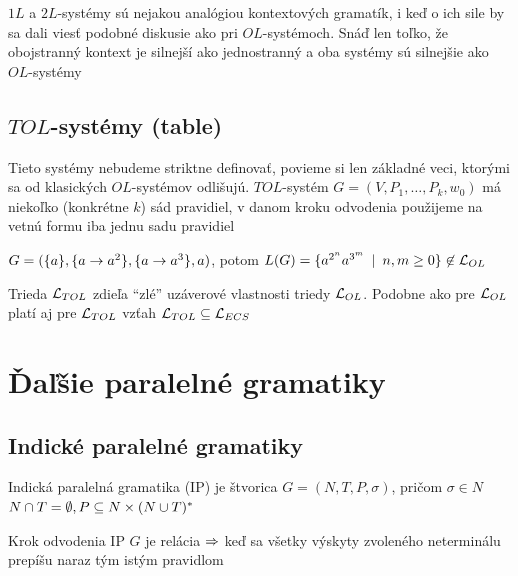 \begin{poznamka}
  $1L$ a $2L$-systémy sú nejakou analógiou kontextových gramatík, i
  keď o ich sile by sa dali viesť podobné diskusie ako pri
  $OL$-systémoch. Snáď len toľko, že obojstranný kontext je silnejší
  ako jednostranný a oba systémy sú silnejšie ako $OL$-systémy
\end{poznamka}

\subsection{$TOL$-systémy (table)}

Tieto systémy nebudeme striktne definovať, povieme si len základné
veci, ktorými sa od kla\-sic\-kých $OL$-systémov odlišujú.
$TOL$-systém $G=(V,P_{1},\dots,P_{k},w_{0})$ má niekoľko
(konkrétne $k$) sád pravidiel, v danom kroku odvodenia použijeme
na vetnú formu iba jednu sadu pravidiel

\begin{priklad}
  $G=(\{a\},\{a\rightarrow a^{2}\},\{a\rightarrow a^{3}\},a)$, potom
  $L(G)=\{a^{2^{n}}a^{3^{m}}\enspace |\enspace n,m\geq0\}\not\in \mathcal{L}_{OL}$
\end{priklad}

\begin{poznamka}
  Trieda $\mathcal{L}_{TOL}$ zdieľa ``zlé'' uzáverové vlastnosti
  triedy $\mathcal{L}_{OL}$. Podobne ako pre $\mathcal{L}_{OL}$
  platí aj pre $\mathcal{L}_{TOL}$ vzťah
  $\mathcal{L}_{TOL} \subseteq \mathcal{L}_{ECS}$
\end{poznamka}

\section{Ďaľšie paralelné gramatiky}

\subsection{Indické paralelné gramatiky}

\begin{definicia}
  Indická paralelná gramatika (IP) je štvorica $G=(N,T,P,\sigma)$,
  pričom \mbox{$\sigma\in N$} $N\cap T=\emptyset, P\subseteq
  N\times(N\cup T)^{*}$
\end{definicia}

\begin{definicia}
  Krok odvodenia IP $G$ je relácia $\Rightarrow$ keď sa všetky výskyty
  zvoleného neterminálu prepíšu naraz tým istým pravidlom
\end{definicia}

